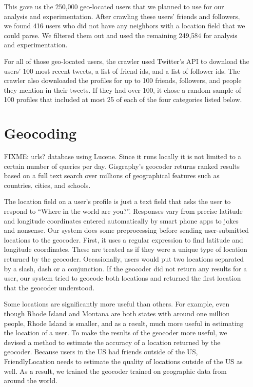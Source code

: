 This gave us the 250,000 geo-located users that we planned to use for our
analysis and experimentation.
After crawling these users' friends and followers, we found 416 users who did
not have any neighbors with a location field that we could parse.
We filtered them out and used the remaining 249,584 for analysis and
experimentation.

For all of those geo-located users, the crawler used Twitter's API to download
the users' 100 most recent tweets, a list of friend ids, and a list of follower ids.
The crawler also downloaded the profiles for up to 100 friends, followers, and
people they mention in their tweets. If they had over 100, it chose a random
sample of 100 profiles that included at most 25 of each of the four
categories listed below.

\section{Geocoding}
FIXME: urls?
database using Lucene. Since
it runs locally it is not limited to a certain number of queries per day.
Gisgraphy's geocoder returns ranked results based on a full text search
over millions of geographical features such as countries, cities, and schools.

The location field on a user's profile is just a text field that asks the user
to respond to ``Where in the world are you?''.
Responses vary from precise latitude and longitude coordinates entered
automatically by smart phone apps to jokes and nonsense.
Our system does some preprocessing before sending user-submitted locations to
the geocoder.
First, it uses a regular expression to find latitude and longitude coordinates.
These are treated as if they were a unique type of location returned by the
geocoder.
Occasionally, users would put two locations separated by a slash, dash or a
conjunction.
If the geocoder did not return any results for a user, our system tried to
geocode both locations and returned the first location that the geocoder
understood.

Some locations are significantly more useful than others.
For example, even though Rhode Island and Montana are both states with around
one million people, Rhode Island is smaller, and as a result, much more useful
in estimating the location of a user.
To make the results of the geocoder more useful, we devised a method to
estimate the accuracy of a location returned by the geocoder.
Because users in the US had friends outside of the US, FriendlyLocation needs
to estimate the quality of
locations outside of the US as well.
As a result, we trained the geocoder trained on geographic data from around the
world.

